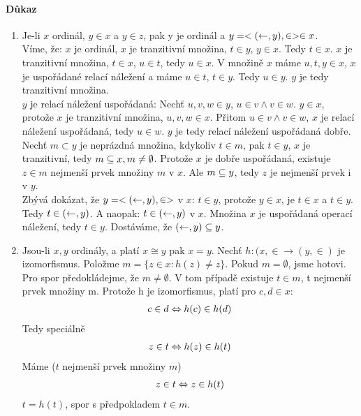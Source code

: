 \documentclass[a4paper,12pt,titlepage]{article}
\begin{document}
\paragraph{Důkaz}
\begin{enumerate}
	\item Je-li $x$ ordinál, $y \in x$ a $y \in z$, pak y je ordinál a $y =
	<(\leftarrow, y), \in> \in x$. \\
	Víme, že: $x$ je ordinál, $x$ je tranzitivní množina, $t \in y$, $y \in x$. Tedy
	$t \in x$. $x$ je tranzitivní množina, $t \in x$, $u \in t$, tedy $u \in x$.
	V množině $x$ máme $u, t, y \in x$, $x$ je uspořádané relací náležení a máme $u
	\in t$, $t \in y$. Tedy $u \in y$. $y$ je tedy tranzitivní množina. \\
	$y$ je relací náležení uspořádaná: Nechť $u, v, w \in y$, $ u \in v \land v
	\in w$. $y \in x$, protože $x$ je tranzitivní množina, $u,v,w \in x$. Přitom
	$u \in v \land v \in w$, $x$ je relací náležení uspořádaná, tedy $u \in w$.
	$y$
	je tedy relací náležení uspořádaná dobře. Nechť $m \subset y$ je neprázdná
	množina, kdykoliv $t \in m$, pak $t \in y$, $x$ je tranzitivní, tedy $m
	\subseteq x, m \neq \emptyset$. Protože $x$ je dobře uspořádaná, existuje $z
	\in m$ nejmenší prvek množiny $m$ v $x$. Ale $m \subseteq y$, tedy $z$ je
	nejmenší prvek i v $y$. \\
	Zbývá dokázat, že $y = <(\leftarrow, y), \in>$ v $x$: $t \in y$, protože $y \in x$,
	je $t \in x$ a $t \in y$. Tedy $t \in (\leftarrow, y)$. A naopak: $t \in (\leftarrow, y)$
	v $x$. Množina $x$ je uspořádaná operací náležení, tedy $t \in y$.
	Dostáváme, že $(\leftarrow, y) \subseteq y$.

	\item Jsou-li $x, y$ ordinály, a platí $x \cong y$ pak $x = y$. Nechť $h: (x,
	\in \to (y, \in)$ je izomorfismus. Položme $m = \{ z \in x: h(z) \neq z \}$.
	Pokud $m = \emptyset$, jsme hotovi. Pro spor předokládejme, že $m \neq
	\emptyset$. V tom případě existuje $t \in m$, t nejmenší prvek množiny m.
	Protože h je izomorfismus, platí pro $c,d \in x$:
	\begin{align}
		c \in d \Leftrightarrow h(c) \in h(d)
	\end{align}
	Tedy speciálně
	\begin{align}
		z \in t \Leftrightarrow h(z) \in h(t)
	\end{align}
	Máme ($t$ nejmenší prvek množiny $m$)
	\begin{align}
		z \in t \Leftrightarrow z \in h(t)
	\end{align}
	$t = h(t)$, spor s předpokladem $t \in m$.


\end{enumerate}
\end{document}
